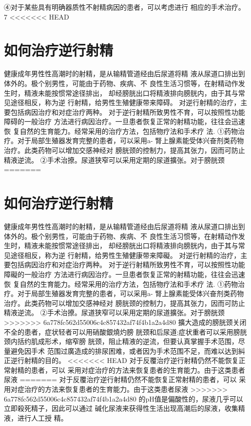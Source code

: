 \documentclass[12pt,UTF8]{ctexbook}
\begin{document}
④对于某些具有明确器质性不射精病因的患者，可以考虑进行
相应的手术治疗。
7
<<<<<<< HEAD
\section{如何治疗逆行射精}
健康成年男性性高潮时的射精，是从输精管道经由后尿道将精
液从尿道口排出到体外的。极个别男性，可能由于药物、疾病、不
良性生活习惯等，在射精动作发生时，精液未能按惯常途径排出，
却经膀胱出口将精液排向膀胱内，由于其与常见途径相反，称为逆
行射精，给男性生殖健康带来障碍。
对逆行射精的治疗，主要包括病因治疗和对症治疗两种。
对于逆行射精所致男性不育，可以按照性功能障碍的一般治疗
方法进行病因治疗。一旦患者恢复正常的射精功能，往往会迅速恢
复自然的生育能力。经常采用的治疗方法，包括物疗法和手术疗
法.
①药物治疗。对于局部生殖器发育完整的患者，可以采用a-
腎上腺素能受体兴奋剂类药物治疗。此类药物可以增加交感神经对
膀胱颈的控制力，提高其张力，因而可防止精液逆流。
②手术治撩。尿道狭窄可以采用定期的尿道擴张。对于膀胱颈
=======
\section{如何治疗逆行射精}
健康成年男性性高潮时的射精，是从输精管道经由后尿道将精
液从尿道口排出到体外的。极个别男性，可能由于药物、疾病、不
良性生活习惯等，在射精动作发生时，精液未能按惯常途径排出，
却经膀胱出口将精液排向膀胱内，由于其与常见途径相反，称为逆
行射精，给男性生殖健康带来障礙。
对逆行射精的治疗，主要包括病因治疗和对症治疗两种。
对于逆行射精所致男性不育，可以按照性功能障礙的一般治疗
方法进行病因治疗。一旦患者恢复正常的射精功能，往往会迅速恢
复自然的生育能力。经常采用的治疗方法，包括物疗法和手术疗
法.
①药物治疗。对于局部生殖器发育完整的患者，可以采用a-
腎上腺素能受体兴奋剂类药物治疗。此类药物可以增加交感神经对
膀胱颈的控制力，提高其张力，因而可防止精液逆流。
②手术治撩。尿道狭窄可以采用定期的尿道擴张。对于膀胱颈
>>>>>>> 6a778fc562d55006c4c857432af74f4b1a2a4d80
擴大造成的膀胱颈关闭不全的患者，症状轻者可以用硝酸銀燒灼膀
胱颈和后尿道;症状重者可以采用膀胱颈内括约肌成形术，缩窄膀
胱颈，阻止精液的逆流，但要认真掌握手术范围，尽量避免因手术
范围过廣造成的排尿困难，或者因为手术范围不足，而难以达到糾
正逆行射精的目的。
<<<<<<< HEAD
对于反覆治疗逆行射精仍然不能恢复正常射精的患者，可以
采用对症治疗的方法来恢复患者的生育能力。由于这类患者尿液
=======
对于反覆治疗逆行射精仍然不能恢复正常射精的患者，可以
采用对症治疗的方法来恢复患者的生育能力。由于这类患者尿液
>>>>>>> 6a778fc562d55006c4c857432af74f4b1a2a4d80
的pH值是偏酸性的，尿液几乎可以立即殺死精子，因此可以通过
碱化尿液来获得性生活出现高潮后的尿液，收集精液，进行人工授
精。
\end{document}
